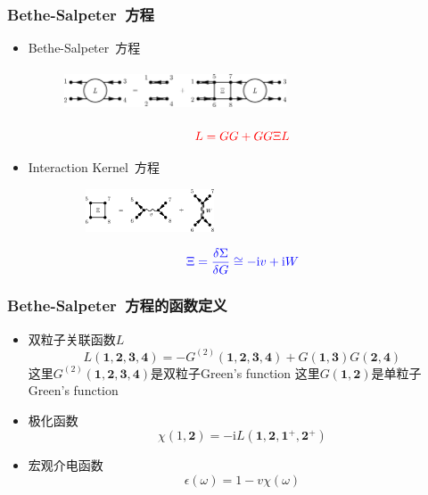 \documentclass[cjk,slidestop,compress,mathserif,blue]{beamer}
\begin{document}
\frame
{
	\frametitle{\textrm{Bethe-Salpeter~}方程}
	\begin{itemize}
		\item \textrm{Bethe-Salpeter~}方程
\begin{figure}[h!]
\centering
\vspace*{-0.15in}
\includegraphics[height=0.5in,width=2.6in,viewport=0 0 350 65,clip]{Figures/BS_equation.png}
\label{BS_equation-1}
\end{figure} 
\begin{displaymath}
	\textcolor{red}{L=GG+GG\Xi L}
\end{displaymath}
		\item \textrm{Interaction Kernel~}方程
\begin{figure}[h!]
\centering
\includegraphics[height=0.5in,width=2.0in,viewport=0 0 250 65,clip]{Figures/K_equation.png}
\label{BS_equation-2}
\end{figure} 
\begin{displaymath}
	\textcolor{blue}{\Xi=\frac{\delta\Sigma}{\delta G}\cong-\mathrm{i}v+\mathrm{i}W}
\end{displaymath}
	\end{itemize}
}

\frame
{
	\frametitle{\textrm{Bethe-Salpeter~}方程的函数定义}
\begin{itemize}
	\item 双粒子关联函数$L$
		\begin{displaymath}
			L(\mathbf{1},\mathbf{2},\mathbf{3},\mathbf{4})=-G^{(2)}(\mathbf{1},\mathbf{2},\mathbf{3},\mathbf{4})+G(\mathbf{1},\mathbf{3})G(\mathbf{2},\mathbf{4})
		\end{displaymath}
		这里$G^{(2)}(\mathbf{1},\mathbf{2},\mathbf{3},\mathbf{4})$是双粒子\textrm{Green's function}
		\vskip 5pt
		这里$G(\mathbf{1},\mathbf{2})$是单粒子\textrm{Green's function}

	\item 极化函数
		\begin{displaymath}
			\chi(\mathrm{1},\mathbf{2})=-\mathrm{i}L(\mathbf{1},\mathbf{2},\mathbf{1}^+,\mathbf{2}^+)
		\end{displaymath}
	\item 宏观介电函数
		\begin{displaymath}
			\epsilon(\omega)=1-v\chi(\omega)
		\end{displaymath}
\end{itemize}
}
\end{document}

